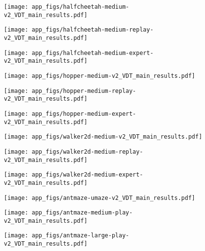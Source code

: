 \begin{figure}[!htbp]
\centering

\begin{minipage}[t]{0.3\textwidth}
\centering
\texttt{[image: app\_figs/halfcheetah-medium-v2\_VDT\_main\_results.pdf]}
\end{minipage}
\begin{minipage}[t]{0.3\textwidth}
\centering
\texttt{[image: app\_figs/halfcheetah-medium-replay-v2\_VDT\_main\_results.pdf]}
\end{minipage}
\begin{minipage}[t]{0.3\textwidth}
\centering
\texttt{[image: app\_figs/halfcheetah-medium-expert-v2\_VDT\_main\_results.pdf]}
\end{minipage}


\begin{minipage}[t]{0.3\textwidth}
\centering
\texttt{[image: app\_figs/hopper-medium-v2\_VDT\_main\_results.pdf]}
\end{minipage}
\begin{minipage}[t]{0.3\textwidth}
\centering
\texttt{[image: app\_figs/hopper-medium-replay-v2\_VDT\_main\_results.pdf]}
\end{minipage}
\begin{minipage}[t]{0.3\textwidth}
\centering
\texttt{[image: app\_figs/hopper-medium-expert-v2\_VDT\_main\_results.pdf]}
\end{minipage}

\begin{minipage}[t]{0.3\textwidth}
\centering
\texttt{[image: app\_figs/walker2d-medium-v2\_VDT\_main\_results.pdf]}
\end{minipage}
\begin{minipage}[t]{0.3\textwidth}
\centering
\texttt{[image: app\_figs/walker2d-medium-replay-v2\_VDT\_main\_results.pdf]}
\end{minipage}
\begin{minipage}[t]{0.3\textwidth}
\centering
\texttt{[image: app\_figs/walker2d-medium-expert-v2\_VDT\_main\_results.pdf]}
\end{minipage}

\begin{minipage}[t]{0.3\textwidth}
\centering
\texttt{[image: app\_figs/antmaze-umaze-v2\_VDT\_main\_results.pdf]}
\end{minipage}
\begin{minipage}[t]{0.3\textwidth}
\centering
\texttt{[image: app\_figs/antmaze-medium-play-v2\_VDT\_main\_results.pdf]}
\end{minipage}
\begin{minipage}[t]{0.3\textwidth}
\centering
\texttt{[image: app\_figs/antmaze-large-play-v2\_VDT\_main\_results.pdf]}
\end{minipage}


\end{figure}
